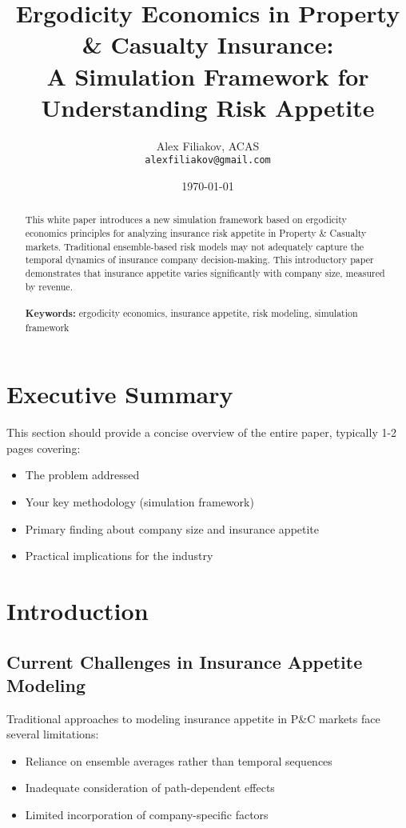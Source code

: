 \documentclass[11pt,letterpaper]{article}
\title{\Large \textbf{Ergodicity Economics in Property \& Casualty Insurance: \\
A Simulation Framework for Understanding Risk Appetite}}
\author{Alex Filiakov, ACAS\\
\texttt{alexfiliakov@gmail.com}}
\date{\today}
\begin{document}
\maketitle

\begin{abstract}
This white paper introduces a new simulation framework based on ergodicity economics principles for analyzing insurance risk appetite in Property \& Casualty markets. Traditional ensemble-based risk models may not adequately capture the temporal dynamics of insurance company decision-making. This introductory paper demonstrates that insurance appetite varies significantly with company size, measured by revenue.
\\\\
\textbf{Keywords:} ergodicity economics, insurance appetite, risk modeling, simulation framework
\end{abstract}

\newpage
\tableofcontents
\newpage

\section{Executive Summary}

This section should provide a concise overview of the entire paper, typically 1-2 pages covering:
\begin{itemize}
    \item The problem addressed
    \item Your key methodology (simulation framework)
    \item Primary finding about company size and insurance appetite
    \item Practical implications for the industry
\end{itemize}


\section{Introduction}

\subsection{Current Challenges in Insurance Appetite Modeling}

Traditional approaches to modeling insurance appetite in P\&C markets face several limitations:
\begin{itemize}
    \item Reliance on ensemble averages rather than temporal sequences
    \item Inadequate consideration of path-dependent effects
    \item Limited incorporation of company-specific factors
\end{itemize}
\end{document}

